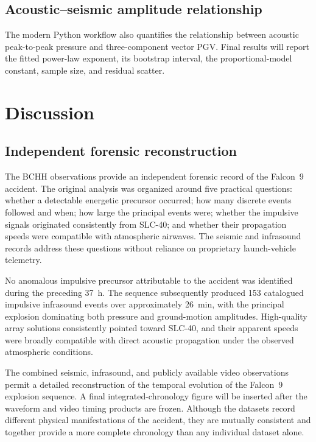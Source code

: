 \documentclass[]{seismica}
\begin{document}
\subsection{Acoustic--seismic amplitude relationship}
\label{sec:results_regression}

The modern Python workflow also quantifies the relationship between acoustic peak-to-peak pressure and three-component vector PGV. Final results will report the fitted power-law exponent, its bootstrap interval, the proportional-model constant, sample size, and residual scatter.

\section{Discussion}
\label{sec:discussion}

\subsection{Independent forensic reconstruction}
\label{sec:discussion_reconstruction}

The BCHH observations provide an independent forensic record of the Falcon~9
accident. The original analysis was organized around five practical questions:
whether a detectable energetic precursor occurred; how many discrete events
followed and when; how large the principal events were; whether the impulsive
signals originated consistently from SLC-40; and whether their propagation
speeds were compatible with atmospheric airwaves. The seismic and infrasound
records address these questions without reliance on proprietary launch-vehicle
telemetry.

No anomalous impulsive precursor attributable to the accident was identified
during the preceding 37~h. The sequence subsequently produced 153 catalogued
impulsive infrasound events over approximately 26~min, with the principal
explosion dominating both pressure and ground-motion amplitudes. High-quality
array solutions consistently pointed toward SLC-40, and their apparent speeds
were broadly compatible with direct acoustic propagation under the observed
atmospheric conditions.

The combined seismic, infrasound, and publicly available video observations
permit a detailed reconstruction of the temporal evolution of the Falcon~9
explosion sequence. A final integrated-chronology figure will be inserted after the waveform and video timing products are frozen. Although the datasets record
different physical manifestations of the accident, they are mutually
consistent and together provide a more complete chronology than any individual
dataset alone.
\end{document}
